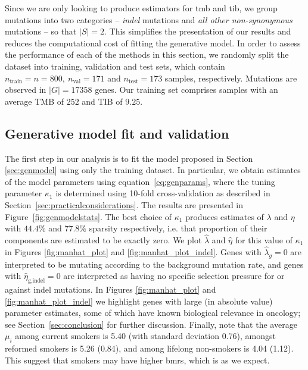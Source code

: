 \documentclass[../thesis.tex]{subfiles}
\begin{document}
Since we are only looking to produce estimators for \gls{tmb} and \gls{tib}, we group mutations into two categories -- \emph{indel} mutations and \emph{all other non-synonymous} mutations -- so that $|S|=2$.  This simplifies the presentation of our results and reduces the computational cost of fitting the generative model.  In order to assess the performance of each of the methods in this section, we randomly split the dataset into training, validation and test sets, which contain $n_{\text{train}} = n = 800, \ n_{\text{val}} =  171$ and $n_{\text{test}} = 173$ samples, respectively.  Mutations are observed in $|G| = 17358$ genes. Our training set comprises samples with an average TMB of $252$ and TIB of $9.25$. 


\subsection{Generative model fit and validation \label{sec:genmodelfit}}

The first step in our analysis is to fit the model proposed in Section \ref{sec:genmodel} using only the training dataset. In particular, we obtain estimates of the model parameters using equation~\eqref{eq:genparams}, where the tuning parameter $\kappa_1$ is determined using 10-fold cross-validation as described in Section~\ref{sec:practicalconsiderations}.  The results are presented in Figure~\ref{fig:genmodelstats}. The best choice of $\kappa_1$ produces estimates of $\lambda$ and $\eta$ with $44.4 \%$ and $77.8 \%$ sparsity respectively, i.e. that proportion of their components are estimated to be exactly zero. We plot $\hat{\lambda}$ and $\hat{\eta}$ for this value of $\kappa_1$ in Figures \ref{fig:manhat_plot} and \ref{fig:manhat_plot_indel}. Genes with $\hat{\lambda}_g = 0$ are interpreted to be mutating according to the background mutation rate, and genes with $\hat{\eta}_{\text{g,indel}} = 0$ are interpreted as having no specific selection pressure for or against indel mutations. In Figures \ref{fig:manhat_plot} and \ref{fig:manhat_plot_indel} we highlight genes with large (in absolute value) parameter estimates, some of which have known biological relevance in oncology; see Section~\ref{sec:conclusion} for further discussion. {Finally, note that the average $\mu_i$ among current smokers is 5.40 (with standard deviation 0.76), amongst reformed smokers is 5.26 (0.84), and among lifelong non-smokers is 4.04 (1.12). This suggest that smokers may have higher \gls{bmr}s, which is as we expect.}
\end{document}
